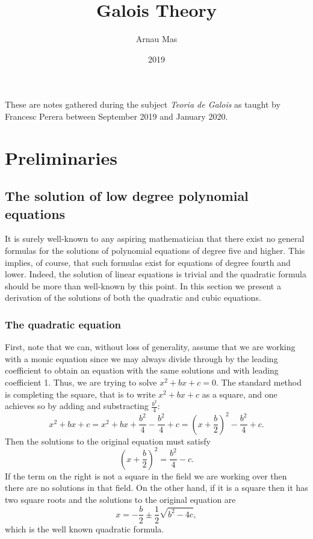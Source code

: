 \documentclass[12pt,oneside]{book}
\title{Galois Theory}
\author{Arnau Mas}
\date{2019}
\begin{document}
\maketitle

\frontmatter
\pagestyle{plain}
These are notes gathered during the subject \emph{Teoria de Galois} as taught by Francesc Perera between September 2019 and January 2020.

\mainmatter

\chapter{Preliminaries}
\section{The solution of low degree polynomial equations}
It is surely well-known to any aspiring mathematician that there exist no general formulas for the solutions of polynomial equations of degree five and higher. This implies, of course, that such formulas exist for equations of degree fourth and lower. Indeed, the solution of linear equations is trivial and the quadratic formula should be more than well-known by this point. In this section we present a derivation of the solutions of both the quadratic and cubic equations. 

\subsection{The quadratic equation}
First, note that we can, without loss of generality, assume that we are working with a monic equation since we may always divide through by the leading coefficient to obtain an equation with the same solutions and with leading coefficient 1. Thus, we are trying to solve \( x^2 + bx + c = 0 \). The standard method is completing the square, that is to write \( x^2 + bx + c \) as a square, and one achieves so by adding and substracting \( \frac{b^2}{4} \):
\begin{equation*}
	x^2 + bx + c = x^2 + bx + \frac{b^2}{4} - \frac{b^2}{4} + c = \left(x + \frac{b}{2}\right)^2 - \frac{b^2}{4} + c.
\end{equation*}
Then the solutions to the original equation must satisfy
\begin{equation*}
	\left(x + \frac{b}{2}\right)^2 = \frac{b^2}{4} - c.
\end{equation*}
If the term on the right is not a square in the field we are working over then there are no solutions in that field. On the other hand, if it is a square then it has two square roots and the solutions to the original equation are
\begin{equation*}
	x = - \frac{b}{2} \pm \frac{1}{2}\sqrt{b^2 - 4c},
\end{equation*}
which is the well known quadratic formula.
\end{document}
